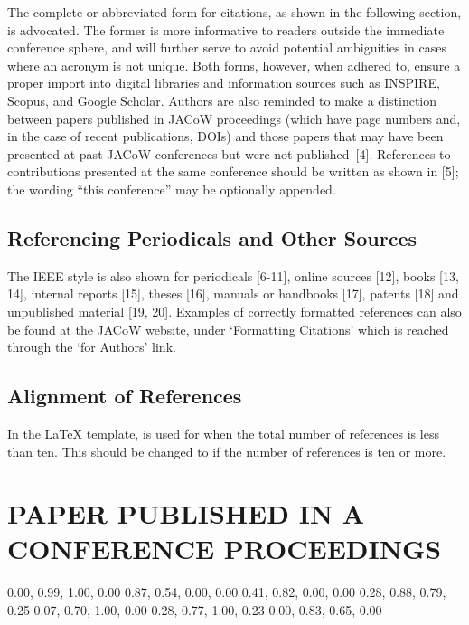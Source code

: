 The complete or abbreviated form for citations, as
shown in the following section, is advocated. The former
is more informative to readers outside the immediate
conference sphere, and will further serve to avoid
potential ambiguities in cases where an acronym is not
unique. Both forms, however, when adhered to, ensure a
proper import into digital libraries and information
sources such as INSPIRE, Scopus, and Google Scholar.
Authors are also reminded to make a distinction between
papers published in JACoW proceedings (which have
page numbers and, in the case of recent publications,
DOIs) and those papers that may have been presented at
past JACoW conferences but were not published~[4].
References to contributions presented at the same
conference should be written as shown in [5]; the wording
“this conference” may be optionally appended.

\subsection{Referencing Periodicals and Other Sources}

The IEEE style is also shown for periodicals [6-11],
online sources [12], books [13, 14], internal reports [15],
theses [16], manuals or handbooks [17], patents [18] and
unpublished material [19, 20]. Examples of correctly
formatted references can also be found at the JACoW website,
under ‘Formatting Citations’ which is reached through the
‘for Authors’ link.

\subsection{Alignment of References}

In the \LaTeX{} template, \verb|| is used for
when the total number of references is less than ten. This
should be changed to \verb|| if the number of
references is ten or more.

\patchcmd{}
\section{PAPER PUBLISHED IN A CONFERENCE PROCEEDINGS}

\definecolor{jred}{cmyk}  {0.00, 0.99, 1.00, 0.00}
\definecolor{jblue}{cmyk} {0.87, 0.54, 0.00, 0.00}
\definecolor{jvio}{cmyk}  {0.41, 0.82, 0.00, 0.00}
\definecolor{jbook}{cmyk} {0.28, 0.88, 0.79, 0.25}
\definecolor{jrept}{cmyk} {0.07, 0.70, 1.00, 0.00}
\definecolor{jmanu}{cmyk} {0.28, 0.77, 1.00, 0.23}
\definecolor{junpu}{cmyk} {0.00, 0.83, 0.65, 0.00}


